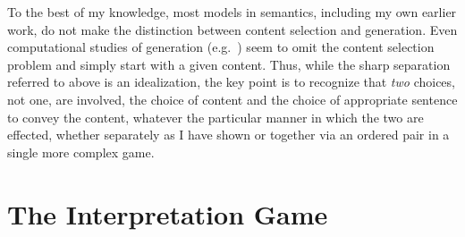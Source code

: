 To the best of my knowledge, most models in semantics, including my own earlier work, do not make the distinction between content selection and generation. Even computational studies of generation (e.g.\ \citealt[Chapter~24]{jm:slp2}) seem to omit the content selection problem and simply start with a given content. Thus, while the sharp separation referred to above is an idealization, the key point is to recognize that \emph{two} choices, not one, are involved, the choice of content and the choice of appropriate sentence to convey the content, whatever the particular manner in which the two are effected, whether separately as I have shown or together via an ordered pair in a single more complex game.

\section{The Interpretation Game} \label{sec:interpretation game}

